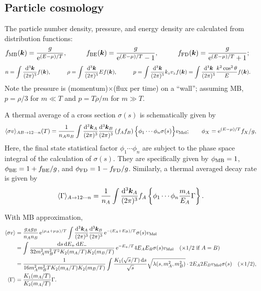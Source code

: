 \documentclass[CheatSheet]{subfiles}
\begin{document}
\subsection{Particle cosmology}
The particle number density, pressure, and energy density are calculated from distribution functions:
\begin{alignat}{3}
 f_{\text{MB}}({\boldsymbol{k}})&=\frac{g}{\mathop{}\!\mathrm{e}^{(E-\mu)/T}},\qquad&
 f_{\text{BE}}({\boldsymbol{k}})&=\frac{g}{\mathop{}\!\mathrm{e}^{(E-\mu)/T}-1},\qquad&
 f_{\text{FD}}({\boldsymbol{k}})&=\frac{g}{\mathop{}\!\mathrm{e}^{(E-\mu)/T}+1};
\end{alignat}
\begin{alignat}{3}
 n   &=\int\frac{\mathop{}\!\mathrm{d}^{3}{\boldsymbol{k}}}{(2\pi)^{3}}f({\boldsymbol{k}}),\qquad&
 \rho&=\int\frac{\mathop{}\!\mathrm{d}^{3}{\boldsymbol{k}}}{(2\pi)^{3}}Ef({\boldsymbol{k}}),\qquad&
 p   &=\int\frac{\mathop{}\!\mathrm{d}^{3}{\boldsymbol{k}}}{(2\pi)^{3}}k_zv_z f({\boldsymbol{k}})
      =\int\frac{\mathop{}\!\mathrm{d}^{3}{\boldsymbol{k}}}{(2\pi)^{3}}\frac{k^2\cos^2\theta}{E} f({\boldsymbol{k}}).
\end{alignat}
Note the pressure is (momentum)$\times$(flux per time) on a ``wall''; assuming MB, $p=\rho/3$ for $m\ll T$ and $p=T\rho/m$ for $m\gg T$.

A thermal average of a cross section $\sigma(s)$ is schematically given by
\begin{equation}
 \vev{\sigma v}_{AB\to12\cdots n}(T)
=\frac{1}{n_An_B}\int\ddP{k_A}\ddP{k_B}\left(
f_A f_B\right)\Bigl\{\phi_1 \cdots \phi_n\sigma(s)\Bigr\}
v_{\text{M\o l}};\qquad \phi_X = \ee^{(E-\mu)/T}f_X/g,
\end{equation}
Here, the final state statistical factor $\phi_1\cdots\phi_n$ are subject to the phase space integral of the calculation of $\sigma(s)$. They are specifically given by $\phi_{\text{MB}}=1$, $\phi_{\text{BE}}=1+f_{\text{BE}}/g$, and $\phi_{\text{FD}}=1-f_{\text{FD}}/g$.
Similarly, a thermal averaged decay rate is given by
\begin{equation}
 \langle\Gamma\rangle_{A\to12\cdots n}
=\frac{1}{n_A}\int\frac{\mathop{}\!\mathrm{d}^{3}{\boldsymbol{k}}_A}{(2\pi)^{3}}
f_A \left\{\phi_1 \cdots \phi_n
\frac{m_A}{E_A}\Gamma\right\}.
\end{equation}


With MB approximation,
\begin{align}
 \vev{\sigma v}
&=
\frac{g_Ag_B}{n_An_B}
\ee^{(\mu_A+\mu_B)/T}
\int\ddP{k_A}\ddP{k_B}
\ee^{-(E_A+E_B)/T}
\sigma(s)v_{\text{M\o l}}
\\
&=
\int\frac{\dd s\dd E_+ \dd E_-}{32m_A^2 m_B^2 T^2 K_2(m_A/T)K_2(m_B/T)}
\ee^{-E_+/T}
4E_AE_B\sigma(s)v_{\text{M\o l}}\quad(\text{$\times1/2$ if $A=B$)}
\\
&=
\frac{1}{16m_A^2 m_B^2 T K_2(m_A/T)K_2(m_B/T)}
\int
\frac{K_1(\sqrt{s}/T) \dd s}{\sqrt{s}}
\sqrt{\Kallen(s,m_A^2,m_B^2)}
\cdot2E_A2E_Bv_{\text{M\o l}}\sigma(s)
\quad(\times1/2),
\\
 \vev{\Gamma}
 &=\frac{K_1(m_A/T)}{K_2(m_A/T)}\Gamma.
\end{align}
\end{document}
